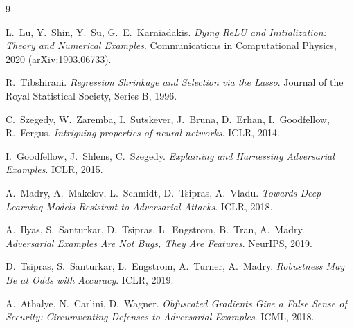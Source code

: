 \documentclass[11pt]{article}
\begin{document}
\begin{thebibliography}{9}

L.~Lu, Y.~Shin, Y.~Su, G.~E.~Karniadakis.
\emph{Dying ReLU and Initialization: Theory and Numerical Examples}.
Communications in Computational Physics, 2020 (arXiv:1903.06733).

R.~Tibshirani.
\emph{Regression Shrinkage and Selection via the Lasso}.
Journal of the Royal Statistical Society, Series B, 1996.

C.~Szegedy, W.~Zaremba, I.~Sutskever, J.~Bruna, D.~Erhan, I.~Goodfellow,
R.~Fergus.
\emph{Intriguing properties of neural networks}.
ICLR, 2014.

I.~Goodfellow, J.~Shlens, C.~Szegedy.
\emph{Explaining and Harnessing Adversarial Examples}.
ICLR, 2015.

A.~Madry, A.~Makelov, L.~Schmidt, D.~Tsipras, A.~Vladu.
\emph{Towards Deep Learning Models Resistant to Adversarial Attacks}.
ICLR, 2018.

A.~Ilyas, S.~Santurkar, D.~Tsipras, L.~Engstrom, B.~Tran, A.~Madry.
\emph{Adversarial Examples Are Not Bugs, They Are Features}.
NeurIPS, 2019.

D.~Tsipras, S.~Santurkar, L.~Engstrom, A.~Turner, A.~Madry.
\emph{Robustness May Be at Odds with Accuracy}.
ICLR, 2019.

A.~Athalye, N.~Carlini, D.~Wagner.
\emph{Obfuscated Gradients Give a False Sense of Security: Circumventing
Defenses to Adversarial Examples}.
ICML, 2018.

\end{thebibliography}
\end{document}
